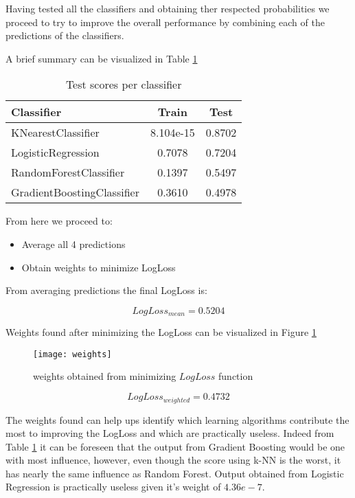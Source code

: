 Having tested all the classifiers and obtaining ther respected probabilities we proceed to try to improve the overall performance by combining each of the predictions of the classifiers.

A brief summary can be visualized in Table \ref{table:summaryLogLoss}
\begin{table}[h!]
	\centering
	\caption{Test scores per classifier}
	\begin{tabular}{| l | c | c |}
		\hline
		\textbf{Classifier} & \textbf{Train} & \textbf{Test}\\
		\hline
		KNearestClassifier & 8.104e-15 & 0.8702 \\ \hline
		LogisticRegression & 0.7078 & 0.7204 \\ \hline
		RandomForestClassifier & 0.1397 & 0.5497 \\ \hline
		GradientBoostingClassifier & 0.3610 & 0.4978 \\ \hline
	\end{tabular}
	\label{table:summaryLogLoss}
\end{table}

From here we proceed to:
\begin{itemize}
	\item Average all 4 predictions
	\item Obtain weights to minimize LogLoss
\end{itemize}

From averaging predictions the final LogLoss is:

$$ LogLoss_{mean} = 0.5204 $$

Weights found after minimizing the LogLoss can be visualized in Figure \ref{fig:weights}
\begin{figure}[h!]
	\centering
	\texttt{[image: weights]}
	\caption{weights obtained from minimizing $LogLoss$ function}
	\label{fig:weights}
\end{figure}

$$ LogLoss_{weighted} = 0.4732 $$

The weights found can help ups identify which learning algorithms contribute the most to improving the LogLoss and which are practically useless. Indeed from Table \ref{table:summaryLogLoss} it can be foreseen that the output from Gradient Boosting would be one with most influence, however, even though the score using k-NN is the worst, it has nearly the same influence as Random Forest. Output obtained from Logistic Regression is practically useless given it's weight of $4.36e-7$.

